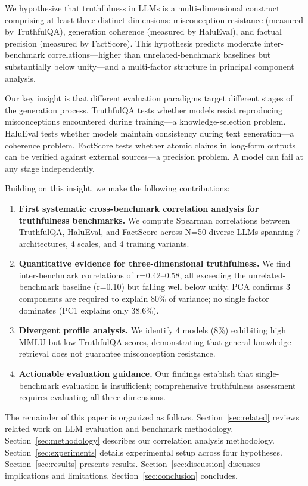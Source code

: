 We hypothesize that truthfulness in LLMs is a multi-dimensional construct comprising at least three distinct dimensions: misconception resistance (measured by TruthfulQA), generation coherence (measured by HaluEval), and factual precision (measured by FactScore). This hypothesis predicts moderate inter-benchmark correlations---higher than unrelated-benchmark baselines but substantially below unity---and a multi-factor structure in principal component analysis.

Our key insight is that different evaluation paradigms target different stages of the generation process. TruthfulQA tests whether models resist reproducing misconceptions encountered during training---a knowledge-selection problem. HaluEval tests whether models maintain consistency during text generation---a coherence problem. FactScore tests whether atomic claims in long-form outputs can be verified against external sources---a precision problem. A model can fail at any stage independently.

Building on this insight, we make the following contributions:

\begin{enumerate}
\item \textbf{First systematic cross-benchmark correlation analysis for truthfulness benchmarks.} We compute Spearman correlations between TruthfulQA, HaluEval, and FactScore across N=50 diverse LLMs spanning 7 architectures, 4 scales, and 4 training variants.

\item \textbf{Quantitative evidence for three-dimensional truthfulness.} We find inter-benchmark correlations of r=0.42--0.58, all exceeding the unrelated-benchmark baseline (r=0.10) but falling well below unity. PCA confirms 3 components are required to explain 80\% of variance; no single factor dominates (PC1 explains only 38.6\%).

\item \textbf{Divergent profile analysis.} We identify 4 models (8\%) exhibiting high MMLU but low TruthfulQA scores, demonstrating that general knowledge retrieval does not guarantee misconception resistance.

\item \textbf{Actionable evaluation guidance.} Our findings establish that single-benchmark evaluation is insufficient; comprehensive truthfulness assessment requires evaluating all three dimensions.
\end{enumerate}

The remainder of this paper is organized as follows. Section~\ref{sec:related} reviews related work on LLM evaluation and benchmark methodology. Section~\ref{sec:methodology} describes our correlation analysis methodology. Section~\ref{sec:experiments} details experimental setup across four hypotheses. Section~\ref{sec:results} presents results. Section~\ref{sec:discussion} discusses implications and limitations. Section~\ref{sec:conclusion} concludes.
